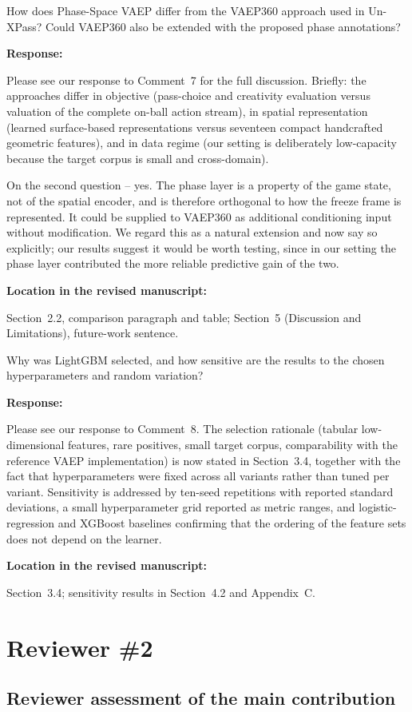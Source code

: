 \documentclass[11pt,a4paper]{article}
\newcommand{\pending}[1]{\textcolor{statuspending}{#1}}
\newcommand{\response}[2]{%
  \begin{responsebox}
  \textbf{Response:}

  #1
  \end{responsebox}
  \begin{locationbox}
  \textbf{Location in the revised manuscript:}

  #2
  \end{locationbox}
}
\begin{document}
\begin{reviewbox}[Question 6]
How does Phase-Space VAEP differ from the VAEP360 approach used in Un-XPass? Could VAEP360 also be extended with the proposed phase annotations?
\end{reviewbox}
\response{Please see our response to Comment~7 for the full discussion. Briefly: the approaches differ in objective (pass-choice and creativity evaluation versus valuation of the complete on-ball action stream), in spatial representation (learned surface-based representations versus seventeen compact handcrafted geometric features), and in data regime (our setting is deliberately low-capacity because the target corpus is small and cross-domain).

On the second question -- yes. The phase layer is a property of the game state, not of the spatial encoder, and is therefore orthogonal to how the freeze frame is represented. It could be supplied to VAEP360 as additional conditioning input without modification. We regard this as a natural extension and now say so explicitly; our results suggest it would be worth testing, since in our setting the phase layer contributed the more reliable predictive gain of the two.}{Section~2.2, comparison paragraph and table; Section~5 (Discussion and Limitations), future-work sentence.}

\begin{reviewbox}[Question 7]
Why was LightGBM selected, and how sensitive are the results to the chosen hyperparameters and random variation?
\end{reviewbox}
\response{\pending{Please see our response to Comment~8. The selection rationale (tabular low-dimensional features, rare positives, small target corpus, comparability with the reference VAEP implementation) is now stated in Section~3.4, together with the fact that hyperparameters were fixed across all variants rather than tuned per variant. Sensitivity is addressed by ten-seed repetitions with reported standard deviations, a small hyperparameter grid reported as metric ranges, and logistic-regression and XGBoost baselines confirming that the ordering of the feature sets does not depend on the learner.}}{Section~3.4; sensitivity results in Section~4.2 and Appendix~C.}

\clearpage
\section{Reviewer \#2}

\subsection{Reviewer assessment of the main contribution}
\end{document}
